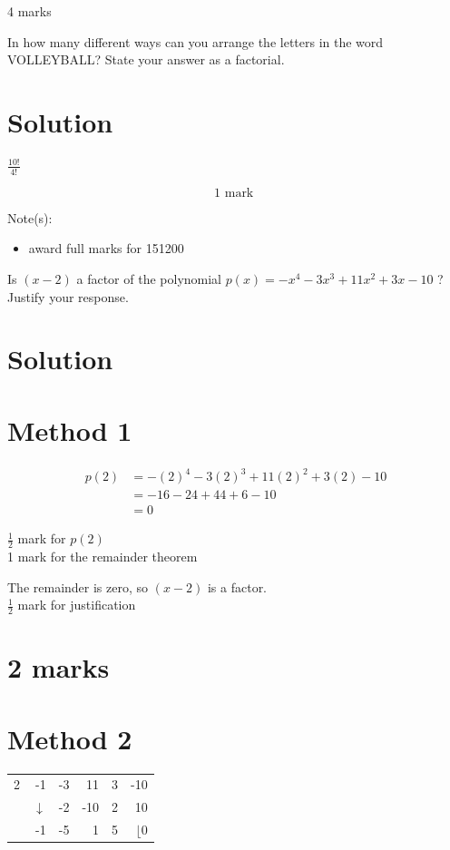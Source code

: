 \documentclass[10pt]{article}
\begin{document}
4 marks

In how many different ways can you arrange the letters in the word VOLLEYBALL? State your answer as a factorial.

\section*{Solution}
$\frac{10!}{4!}$

$$
1 \text { mark }
$$

Note(s):

\begin{itemize}
  \item award full marks for 151200
\end{itemize}

Is $(x-2)$ a factor of the polynomial $p(x)=-x^{4}-3 x^{3}+11 x^{2}+3 x-10$ ?\\
Justify your response.

\section*{Solution}
\section*{Method 1}
$$
\begin{aligned}
p(2) & =-(2)^{4}-3(2)^{3}+11(2)^{2}+3(2)-10 \\
& =-16-24+44+6-10 \\
& =0
\end{aligned}
$$

$\frac{1}{2}$ mark for $p(2)$\\
1 mark for the remainder theorem

The remainder is zero, so $(x-2)$ is a factor.\\
$\frac{1}{2}$ mark for justification

\section*{2 marks}
\section*{Method 2}
\begin{center}
\begin{tabular}{r|rrrrr}
2 & -1 & -3 & 11 & 3 & -10 \\
 & $\downarrow$ & -2 & -10 & 2 & 10 \\
\hline
 & -1 & -5 & 1 & 5 & $\lfloor 0$ \\
\hline
\end{tabular}
\end{center}
\end{document}
